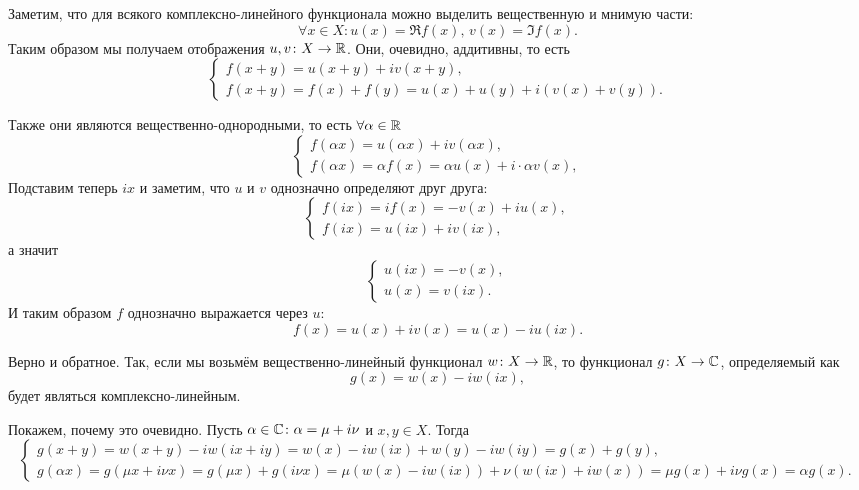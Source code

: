 \begin{note}
    Заметим, что для всякого комплексно-линейного функционала можно выделить вещественную и мнимую части:
    \[
        \forall x \in X\colon u(x) = \Re f(x), \, v(x) = \Im f(x).
    \]
    Таким образом мы получаем отображения $u, v \colon X \to \mathbb{R}$.
    Они, очевидно, аддитивны, то есть
    \[
        \begin{cases}
            f(x + y) = u(x + y) + i v(x + y), \\
            f(x + y) = f(x) + f(y) = u(x) + u(y) + i\left(v(x) + v(y)\right).
        \end{cases}
    \]

    Также они являются вещественно-однородными, то есть $\forall \alpha \in \mathbb{R}$
    \[
        \begin{cases}
            f(\alpha x) = u(\alpha x) + i v(\alpha x), \\
            f(\alpha x) = \alpha f(x) = \alpha u(x) + i \cdot \alpha v(x),
        \end{cases}
    \]
    Подставим теперь $ix$ и заметим, что $u$ и $v$ однозначно определяют друг друга:
    \[
        \begin{cases}
            f(ix) = i f(x) = -v(x) + iu(x), \\
            f(ix) = u(ix) + i v(ix),
        \end{cases}
    \]
    а значит
    \[
        \begin{cases}
            u(ix) = -v(x), \\
            u(x) = v(ix).
        \end{cases}
    \]
    И таким образом $f$ однозначно выражается через $u\colon$
    \[
        f(x) = u(x) + i v(x) = u(x) - i u(ix).
    \]

    Верно и обратное.
    Так, если мы возьмём вещественно-линейный функционал $w\colon X \to \mathbb{R}$, то функционал $g\colon X \to \mathbb{C}$, определяемый как
    \[
        g(x) = w(x) - i w(ix),
    \]
    будет являться комплексно-линейным.

    Покажем, почему это очевидно.
    Пусть $\alpha \in \mathbb{C}\colon \alpha = \mu + i\nu$ и $x, y \in X$.
    Тогда
    \[
        \begin{cases}
            g(x + y) = w(x + y) - iw(ix + iy) = w(x) - iw(ix) + w(y) - iw(iy) = g(x) + g(y), \\
            g(\alpha x) = g(\mu x + i \nu x) = g(\mu x) + g(i \nu x) = \mu(w(x) - iw(ix)) + \nu(w(ix) + iw(x)) = \mu g(x) + i \nu g(x) = \alpha g(x).
        \end{cases}
    \]
\end{note}
